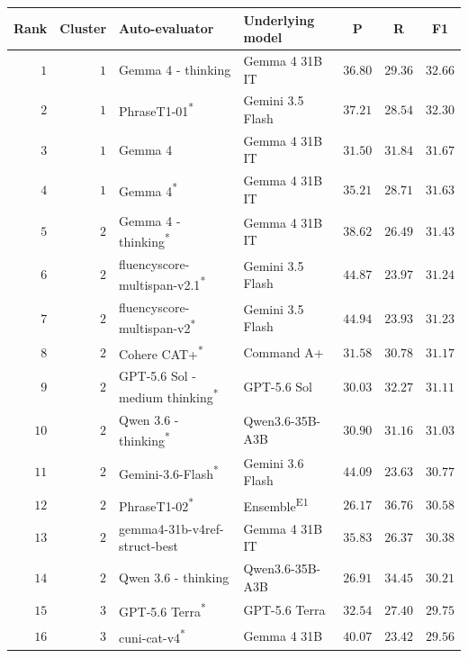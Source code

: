 \begin{table}[t]
\centering
\small
\begin{tabular}{rrllrrr}
\toprule
\multicolumn{1}{c}{Rank} & \multicolumn{1}{c}{Cluster} & Auto-evaluator & Underlying model & \multicolumn{1}{c}{P} & \multicolumn{1}{c}{R} & \multicolumn{1}{c}{F1} \\
\midrule
\rowcolor{black!15} $1$ & $1$ & Gemma 4 - thinking & Gemma 4 31B IT & $36.80$ & $29.36$ & $32.66$ \\
$2$ & $1$ & PhraseT1-01\textsuperscript{*} & Gemini 3.5 Flash & $37.21$ & $28.54$ & $32.30$ \\
\rowcolor{black!15} $3$ & $1$ & Gemma 4 & Gemma 4 31B IT & $31.50$ & $31.84$ & $31.67$ \\
\rowcolor{black!15} $4$ & $1$ & Gemma 4\textsuperscript{*} & Gemma 4 31B IT & $35.21$ & $28.71$ & $31.63$ \\
\rowcolor{black!15} $5$ & $2$ & Gemma 4 - thinking\textsuperscript{*} & Gemma 4 31B IT & $38.62$ & $26.49$ & $31.43$ \\
$6$ & $2$ & fluencyscore-multispan-v2.1\textsuperscript{*} & Gemini 3.5 Flash & $44.87$ & $23.97$ & $31.24$ \\
$7$ & $2$ & fluencyscore-multispan-v2\textsuperscript{*} & Gemini 3.5 Flash & $44.94$ & $23.93$ & $31.23$ \\
$8$ & $2$ & Cohere CAT+\textsuperscript{*} & Command A+ & $31.58$ & $30.78$ & $31.17$ \\
\rowcolor{black!15} $9$ & $2$ & GPT-5.6 Sol - medium thinking\textsuperscript{*} & GPT-5.6 Sol & $30.03$ & $32.27$ & $31.11$ \\
\rowcolor{black!15} $10$ & $2$ & Qwen 3.6 - thinking\textsuperscript{*} & Qwen3.6-35B-A3B & $30.90$ & $31.16$ & $31.03$ \\
\rowcolor{black!15} $11$ & $2$ & Gemini-3.6-Flash\textsuperscript{*} & Gemini 3.6 Flash & $44.09$ & $23.63$ & $30.77$ \\
$12$ & $2$ & PhraseT1-02\textsuperscript{*} & Ensemble\textsuperscript{E1} & $26.17$ & $36.76$ & $30.58$ \\
$13$ & $2$ & gemma4-31b-v4ref-struct-best & Gemma 4 31B IT & $35.83$ & $26.37$ & $30.38$ \\
\rowcolor{black!15} $14$ & $2$ & Qwen 3.6 - thinking & Qwen3.6-35B-A3B & $26.91$ & $34.45$ & $30.21$ \\
\rowcolor{black!15} $15$ & $3$ & GPT-5.6 Terra\textsuperscript{*} & GPT-5.6 Terra & $32.54$ & $27.40$ & $29.75$ \\
$16$ & $3$ & cuni-cat-v4\textsuperscript{*} & Gemma 4 31B & $40.07$ & $23.42$ & $29.56$ \\

\end{tabular}
\end{table}
